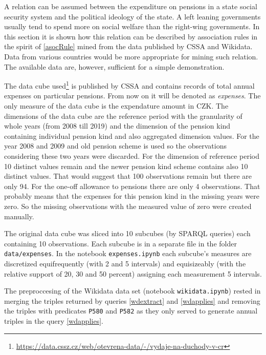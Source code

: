 A relation can be assumed between the expenditure on pensions in a state social security system and the political ideology of the state. A left leaning governments usually tend to spend more on social welfare than the right-wing governments. In this section it is shown how this relation can be described by association rules in the spirit of \ref{asocRule} mined from the data published by CSSA and Wikidata. Data from various countries would be more appropriate for mining such relation. The available data are, however, sufficient for a simple demonstration. 

The data cube used\footnote{\href{https://data.cssz.cz/web/otevrena-data/-/vydaje-na-duchody-v-cr}{https://data.cssz.cz/web/otevrena-data/-/vydaje-na-duchody-v-cr}} is published by CSSA and contains records of total annual expenses on particular pensions. From now on it will be denoted as \textit{expenses}. The only measure of the data cube is the expendature amount in CZK. The dimensions of the data cube are the reference period with the granularity of whole years (from 2008 till 2019) and the dimension of the pension kind containing individual pension kind and also aggregated dimension values. For the year 2008 and 2009 and old pension scheme is used so the observations considering these two years were discarded. For the dimension of reference period 10 distinct values remain and the newer pension kind scheme contains also 10 distinct values. That would suggest that 100 observations remain but there are only 94. For the one-off allowance to pensions there are only 4 observations. That probably means that the expenses for this pension kind in the missing years were zero. So the missing observations with the measured value of zero were created manually.

The original data cube was sliced into 10 subcubes (by SPARQL queries) each containing 10 observations. Each subcube is in a separate file in the folder \verb|data/expenses|. In the notebook \verb|expenses.ipynb| each subcube's measures are discretized equifrequently (with 2 and 5 intervals) and equisizeably (with the relative support of 20, 30 and 50 percent) assigning each measurement 5 intervals.

The preproccesing of the Wikidata data set (notebook \verb|wikidata.ipynb|) rested in merging the triples returned by queries \ref{wdextract} and \ref{wdapplies} and removing the triples with predicates \verb|P580| and \verb|P582| as they only served to generate annual triples in the query \ref{wdapplies}.

